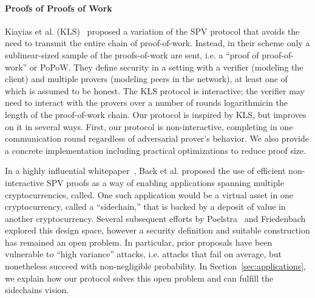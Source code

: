 \paragraph{Proofs of Proofs of Work}
Kiayias et al. (KLS)~\cite{KLS} proposed a variation of the SPV protocol that avoids the need to transmit the entire chain of proof-of-work. Instead, in their scheme only a sublinear-sized sample of the proofs-of-work are sent, i.e. a ``proof of proof-of-work'' or PoPoW. They define security in a setting with a verifier (modeling the client) and multiple provers (modeling peers in the network), at least one of which is assumed to be honest. The KLS protocol is interactive; the verifier may need to interact with the provers over a number of rounds logarithmicin the length of the proof-of-work chain.
Our protocol is inspired by KLS, but improves on it in several ways. First, our protocol is non-interactive, completing in one communication round regardless of adversarial prover's behavior. We also provide a concrete implementation including practical optimizations to reduce proof size.

In a highly influential whitepaper~\cite{sidechains}, Back et al. proposed the use of efficient non-interactive SPV proofs as a way of enabling applications spanning multiple cryptocurrencies, called. One such application would be a virtual asset in one cryptocurrency, called a ``sidechain,'' that is backed by a deposit of value in another cryptocurrency. Several subsequent efforts by Poelstra~\cite{pos} and Friedenbach~\cite{compactspv} explored this design space, however a security definition and suitable construction has remained an open problem. In particular, prior proposals have been vulnerable to ``high variance'' attacks, i.e. attacks that fail on average, but nonetheless succeed with non-negligible probability. In Section~\ref{sec:applications}, we explain how our protocol solves this open problem and can fulfill the sidechains vision.

